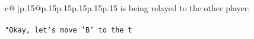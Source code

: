 \documentclass{article}
\begin{document}
{\begin{supertabular}{c@{$\;$}|p{.15\linewidth}@{}p{.15\linewidth}p{.15\linewidth}p{.15\linewidth}p{.15\linewidth}p{.15\linewidth}}
{{{is being relayed to the other player:\\ \tt \\ \tt "Okay, let's move 'B' to the t}}}
\end{supertabular}}
\end{document}

